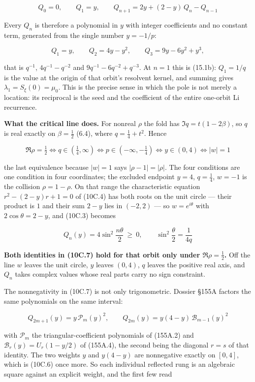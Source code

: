 \documentclass[
  11pt,
]{book}
\begin{document}
\[
\boxed{\;Q_0=0,\qquad Q_1=y,\qquad
Q_{n+1}=2y+(2-y)\,Q_n-Q_{n-1}\;}
\tag{10C.4}
\]

Every \(Q_n\) is therefore a polynomial in \(y\) with integer
coefficients and no constant term, generated from the single number
\(y=-1/p\):

\[
Q_1=y,
\qquad
Q_2=4y-y^2,
\qquad
Q_3=9y-6y^2+y^3,
\tag{10C.5}
\]

that is \(q^{-1}\), \(4q^{-1}-q^{-2}\) and \(9q^{-1}-6q^{-2}+q^{-3}\).
At \(n=1\) this is (15.1b): \(Q_1=1/q\) is the value at the origin of
that orbit's resolvent kernel, and summing gives
\(\lambda_1=S_\xi(0)=\mu_0\). This is the precise sense in which the
pole is not merely a location: its reciprocal is the seed and the
coefficient of the entire one-orbit Li recurrence.

\textbf{What the critical line does.} For nonreal \(\rho\) the fold has
\(\Im q=t(1-2\beta)\), so \(q\) is real exactly on \(\beta=\tfrac12\)
(6.4), where \(q=\tfrac14+t^2\). Hence

\[
\boxed{\;\Re\rho=\tfrac12
\iff q\in(\tfrac14,\infty)
\iff p\in(-\infty,-\tfrac14)
\iff y\in(0,4)
\iff |w|=1\;}
\tag{10C.6}
\]

the last equivalence because \(|w|=1\) says \(|\rho-1|=|\rho|\). The
four conditions are one condition in four coordinates; the excluded
endpoint \(y=4\), \(q=\tfrac14\), \(w=-1\) is the collision
\(\rho=1-\rho\). On that range the characteristic equation
\(r^2-(2-y)r+1=0\) of (10C.4) has both roots on the unit circle ---
their product is \(1\) and their sum \(2-y\) lies in \((-2,2)\) --- so
\(w=e^{i\theta}\) with \(2\cos\theta=2-y\), and (10C.3) becomes

\[
Q_n(y)=4\sin^2\frac{n\theta}{2}\ \ge\ 0,
\qquad
\sin^2\frac{\theta}{2}=\frac1{4q}
\tag{10C.7}
\]

\textbf{Both identities in (10C.7) hold for that orbit only under
\(\Re\rho=\tfrac12\).} Off the line \(w\) leaves the unit circle, \(y\)
leaves \((0,4)\), \(q\) leaves the positive real axis, and \(Q_n\) takes
complex values whose real parts carry no sign constraint.

The nonnegativity in (10C.7) is not only trigonometric. Dossier §155A
factors the same polynomials on the same interval:

\[
Q_{2m+1}(y)=y\,\mathcal P_m(y)^2,
\qquad
Q_{2m}(y)=y(4-y)\,\mathcal B_{m-1}(y)^2
\tag{10C.8}
\]

with \(\mathcal P_m\) the triangular-coefficient polynomials of (155A.2)
and \(\mathcal B_r(y)=U_r(1-y/2)\) of (155A.4), the second being the
diagonal \(r=s\) of that identity. The two weights \(y\) and \(y(4-y)\)
are nonnegative exactly on \([0,4]\), which is (10C.6) once more. So
each individual reflected rung is an algebraic square against an
explicit weight, and the first few read
\end{document}
